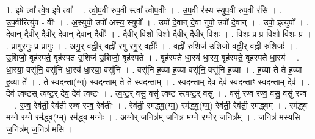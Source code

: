 \documentclass[17pt]{extarticle}
\begin{document}
1. इ॒षे त्वा᳚ त्वे॒ष इ॒षे त्वा᳚ । . त्वो॒प॒वी रु॑प॒वी स्त्वा᳚ त्वोप॒वीः । . उ॒प॒वी र॑स्य स्युप॒वी रु॑प॒वी र॑सि । . उ॒प॒वीरित्यु॑प - वीः । . अ॒स्युपो॒ उपो॑ अस्य॒ स्युपो᳚ । . उपो॑ दे॒वान् दे॒वा नुपो॒ उपो॑ दे॒वान् । . उपो॒ इत्युपो᳚ । . दे॒वान् दैवी॒र् दैवी᳚र् दे॒वान् दे॒वान् दैवीः᳚ । . दैवी॒र् विशो॒ विशो॒ दैवी॒र् दैवी॒र् विशः॑ । . विशः॒ प्र प्र विशो॒ विशः॒ प्र । . प्रागु॑रगुः॒ प्र प्रागुः॑ । . अ॒गु॒र् वह्नी॒र् वह्नी॑ रगु रगु॒र् वह्नीः᳚ । . वह्नी॑ रु॒शिज॑ उ॒शिजो॒ वह्नी॒र् वह्नी॑ रु॒शिजः॑ । . उ॒शिजो॒ बृह॑स्पते॒ बृह॑स्पत उ॒शिज॑ उ॒शिजो॒ बृह॑स्पते । . बृह॑स्पते धा॒रय॑ धा॒रय॒ बृह॑स्पते॒ बृह॑स्पते धा॒रय॑ । . धा॒रया॒ वसू॑नि॒ वसू॑नि धा॒रय॑ धा॒रया॒ वसू॑नि । . वसू॑नि ह॒व्या ह॒व्या वसू॑नि॒ वसू॑नि ह॒व्या । . ह॒व्या ते॑ ते ह॒व्या ह॒व्या ते᳚ । . ते॒ स्व॒द॒न्ता॒(ग्ग्॒) स्व॒द॒न्ता॒म् ते॒ ते॒ स्व॒द॒न्ता॒म् । . स्व॒द॒न्ता॒म् देव॒ देव॑ स्वदन्ताꣳ स्वदन्ता॒म् देव॑ । . देव॑ त्वष्टस् त्वष्ट॒र् देव॒ देव॑ त्वष्टः । . त्व॒ष्ट॒र् वसु॒ वसु॑ त्वष्ट स्त्वष्ट॒र् वसु॑ । . वसु॑ रण्व रण्व॒ वसु॒ वसु॑ रण्व । . र॒ण्व॒ रेव॑ती॒ रेव॑ती रण्व रण्व॒ रेव॑तीः । . रेव॑ती॒ रम॑द्ध्व॒(ग्म्॒) रम॑द्ध्व॒(ग्म्॒) रेव॑ती॒ रेव॑ती॒ रम॑द्ध्वम् । . रम॑द्ध्व म॒ग्ने र॒ग्ने रम॑द्ध्व॒(ग्म्॒) रम॑द्ध्व म॒ग्नेः । . अ॒ग्नेर् ज॒नित्र॑म् ज॒नित्र॑ म॒ग्ने र॒ग्नेर् ज॒नित्र᳚म् । . ज॒नित्र॑ मस्यसि ज॒नित्र॑म् ज॒नित्र॑ मसि । \newline
\end{document}
